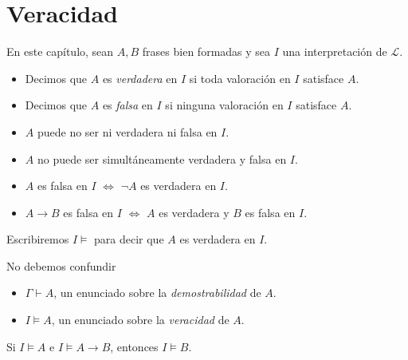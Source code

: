 \chapter{Veracidad}

\begin{preliminaries}
En este capítulo, sean $A, B$ frases bien formadas y sea $I$ una interpretación de $\mathscr L$.
\end{preliminaries}

\begin{definition}
\leavevmode
\begin{itemize}
    \item Decimos que $A$ es \textit{verdadera} en $I$ si toda valoración en $I$ satisface $A$.
    \item Decimos que $A$ es \textit{falsa} en $I$ si ninguna valoración en $I$ satisface $A$.
\end{itemize}
\end{definition}

\begin{remarks}
\leavevmode
\begin{itemize}
    \item $A$ puede no ser ni verdadera ni falsa en $I$.
    \item $A$ no puede ser simultáneamente verdadera y falsa en $I$.
    \item $A$ es falsa en $I$ $\iff$ $\neg A$ es verdadera en $I$.
    \item $A \to B$ es falsa en $I$ $\iff$ $A$ es verdadera y $B$ es falsa en $I$.
\end{itemize}
\end{remarks}

\begin{notation}
Escribiremos $I \vDash$ para decir que $A$ es verdadera en $I$.
\end{notation}

\begin{remark}
No debemos confundir
\begin{itemize}
    \item $\Gamma \vdash A$, un enunciado sobre la \textit{demostrabilidad} de $A$.
    \item $I \vDash A$, un enunciado sobre la \textit{veracidad} de $A$.
\end{itemize}
\end{remark}

\begin{proposition}
Si $I \vDash A$ e $I \vDash A \to B$, entonces $I \vDash B$.
\end{proposition}

